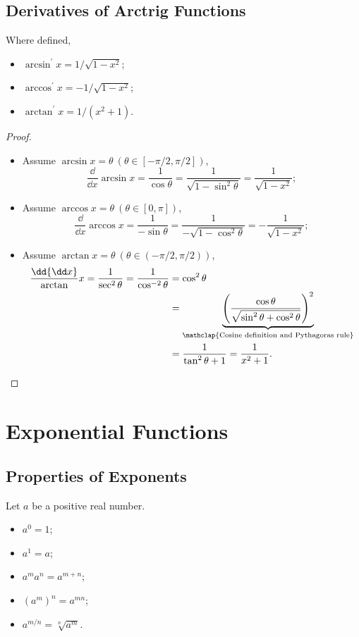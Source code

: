\subsection{Derivatives of Arctrig Functions}
Where defined,
\begin{itemize}
\item$\arcsin^\prime x=1/\sqrt{1-x^2}$;
\item$\arccos^\prime x=-1/\sqrt{1-x^2}$;
\item$\arctan^\prime x=1/(x^2+1)$.
\end{itemize}
\begin{proof}\leavevmode
  \begin{itemize}
  \item Assume $\arcsin x=\theta\ \left(\theta\in\left[-\pi/2,\pi/2\right]\right)$,
    \[
    \frac\dd{\dd x}\arcsin x=\frac1{\cos\theta}=\frac1{\sqrt{1-\sin^2 \theta}}=\frac1{\sqrt{1-x^2}};
    \]
  \item Assume $\arccos x=\theta\ \left(\theta\in\left[0,\pi\right]\right)$,
    \[
    \frac\dd{\dd x}\arccos x=\frac1{-\sin\theta}=\frac1{-\sqrt{1-\cos^2 \theta}}=-\frac1{\sqrt{1-x^2}};
    \]
  \item Assume $\arctan x=\theta\ \left(\theta\in\left(-\pi/2,\pi/2\right)\right)$,
    \begin{align*}
      \frac\dd{\dd x}\arctan x=\frac1{\sec^2 \theta}=\frac1{\cos^{-2}\theta}
      & =\cos^2 \theta\\
      & =\underbrace{\left(\frac{\cos\theta}{\sqrt{\sin^2 \theta+\cos^2 \theta}}\right)^2}_{\mathclap{\text{Cosine definition and Pythagoras rule}}}\\
      & =\frac1{\tan^2 \theta+1}=\frac1{x^2+1}.
    \end{align*}
  \end{itemize}
\end{proof}

\section{Exponential Functions}
\subsection{Properties of Exponents}
Let $a$ be a positive real number.
\begin{itemize}
\item $a^0=1$;
\item $a^1=a$;
\item $a^m a^n=a^{m+n}$;
\item $(a^m)^n=a^{mn}$;
\item $a^{m/n}=\sqrt[n]{a^m}$.
\end{itemize}

